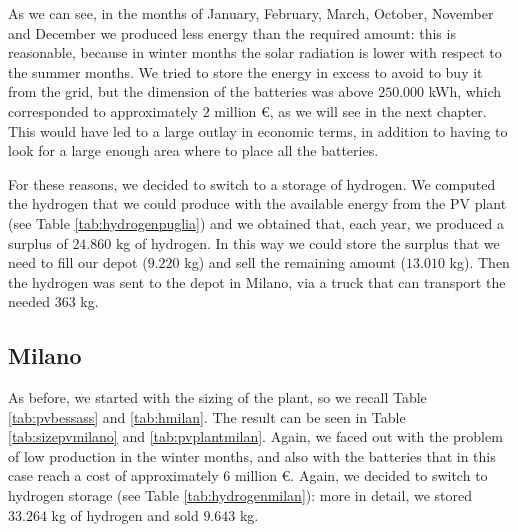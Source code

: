 

As we can see, in the months of January, February, March, October, November and December we produced less energy than the required amount: this is reasonable, because in winter months the solar radiation is lower with respect to the summer months. We tried to store the energy in excess to avoid to buy it from the grid, but the dimension of the batteries was above $250.000$ kWh, which corresponded to approximately $2$ million €, as we will see in the next chapter. This would have led to a large outlay in economic terms, in addition to having to look for a large enough area where to place all the batteries.



For these reasons, we decided to switch to a storage of hydrogen. We computed the hydrogen that we could produce with the available energy from the PV plant (see Table \ref{tab:hydrogenpuglia}) and we obtained that, each year, we produced a surplus of $24.860$ kg of hydrogen. In this way we could store the surplus that we need to fill our depot ($9.220$ kg) and sell the remaining amount ($13.010$ kg). Then the hydrogen was sent to the depot in Milano, via a truck that can transport the needed $363$ kg.



\subsection{Milano}
As before, we started with the sizing of the plant, so we recall Table \ref{tab:pvbessass} and \ref{tab:hmilan}. The result can be seen in Table \ref{tab:sizepvmilano} and \ref{tab:pvplantmilan}. Again, we faced out with the problem of low production in the winter months, and also with the batteries that in this case reach a cost of approximately $6$ million €. Again, we decided to switch to hydrogen storage (see Table \ref{tab:hydrogenmilan}): more in detail, we stored $33.264$ kg of hydrogen and sold $9.643$ kg.





